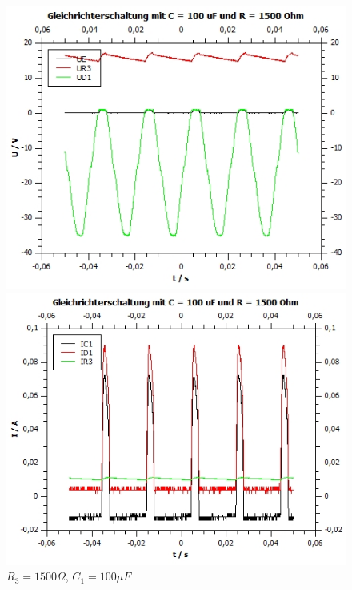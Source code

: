 \documentclass[12pt,a4paper,twoside]{article}
\begin{document}
\begin{figure}[H]
    \begin{minipage}[b]{.5\linewidth} %
        \includegraphics[width=1\linewidth]{nudes/Aufgabe 3 plots/1500 ohm 100 uf U.jpg}
        \caption{$R_3 = 1500 \Omega$, $C_1 = 100 \mu F$}
    \end{minipage}
    \hspace{0.01\linewidth}%
    \begin{minipage}[b]{.5\linewidth} %
        \includegraphics[width=1\linewidth]{nudes/Aufgabe 3 plots/1500 ohm 100 uf I.jpg}
    \caption{$R_3 = 1500 \Omega$, $C_1 = 100 \mu F$}
    \end{minipage}
\end{figure}
\end{document}
